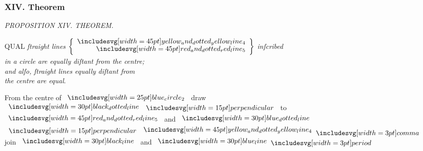 \documentclass[12pt,preview]{standalone}
\begin{document}
\subsubsection{XIV. Theorem}

\begin{minipage}[t]{0.33\textwidth}
    \vspace{40pt}
    
\end{minipage}%
\hfill
\begin{minipage}[t]{0.64\textwidth}
    \vspace{0pt}

    \begin{center}
        \textit{PROPOSITION XIV. THEOREM.}\label{book3pr14} \\
    \end{center}

    \hfill

    \begin{center}
        \raggedright \lettrine[lines=4, loversize=1, nindent=0pt]{}{}QUAL \textit{ſtraight lines} $\left\{\begin{aligned} \bimg{yellow_and_dotted_yellow_line_4} \\[-2ex] \bimg{red_and_dotted_red_line_5} \end{aligned}\right\}$ \textit{inſcribed\\ in a circle are equally diſtant from the centre;\\ and alſo, ſtraight lines equally diſtant from\\ the centre are equal}.
    \end{center}

    \hfill

    \hfill

    \begin{center}
        From the centre of $\img{blue_circle_2}$ draw\\
        $\dottedblackline \bperp$ to $\bimg{red_and_dotted_red_line_5}$ and $\dottedblueline$\\
        $\bperp \bimg{yellow_and_dotted_yellow_line_4} \bcomma$ join $\blackline$ and $\blueline \bperiod$
    \end{center}

    \hfill


\end{minipage}
\end{document}
